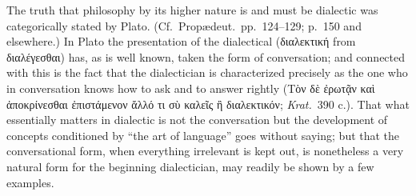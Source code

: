 \documentclass[12pt,a4paper]{book}
\begin{document}
The truth that philosophy by its higher nature is and must be dialectic was
categorically stated by Plato. (Cf.\ Propædeut.\ pp.~124--129; p.~150 and
elsewhere.) In Plato the presentation of the dialectical (διαλεκτική from
διαλέγεσθαι) has, as is well known, taken the form of conversation; and
connected with this is the fact that the dialectician is characterized
precisely as the one who in conversation knows how to ask and to answer rightly
(Τὸν δὲ ἐρωτᾷν καὶ ἀποκρίνεσθαι ἐπιστάμενον ἄλλό τι σὺ καλεῖς ἢ διαλεκτικόν;
\textit{Krat.}\ 390 c.). That what essentially matters in dialectic is not the
conversation but the development of concepts conditioned by ``the art of
language'' goes without saying; but that the conversational form, when
everything irrelevant is kept out, is nonetheless a very natural form for the
beginning dialectician, may readily be shown by a few examples.
\end{document}
